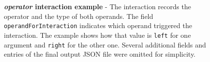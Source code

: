\begin{figure}[tp]
	\centering
	\begin{lrbox}{\mintedbox}
		\begin{minipage}{0.34\textwidth}
		\end{minipage}
	\end{lrbox}
	\hfill
	\begin{lrbox}{\mintedbox}
		\begin{minipage}{0.62\textwidth}
		\end{minipage}
	\end{lrbox}
	\caption[\textit{operator} interaction example]{\textbf{\textit{operator} interaction example} - The interaction records the operator and the type of both operands. The field \texttt{operandForInteraction} indicates which operand triggered the interaction. The example shows how that value is \texttt{left} for one argument and \texttt{right} for the other one. Several additional fields and entries of the final output JSON file were omitted for simplicity.}
	\label{fig:run-time-information-gathering-operator}
\end{figure}